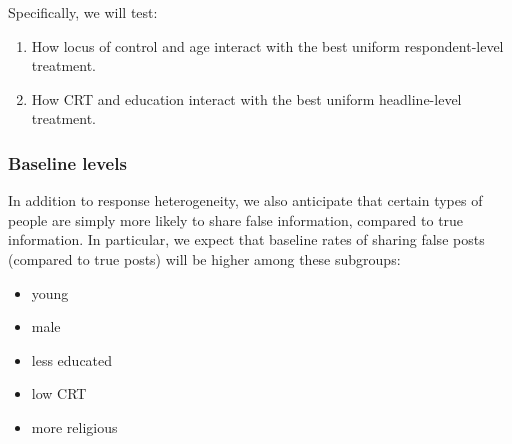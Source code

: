 \documentclass[letterpaper, 12pt, parskip=full,DIV=10]{scrartcl}
\begin{document}
Specifically, we will test:
\begin{enumerate}
\item How locus of control and age interact with the best uniform respondent-level treatment. 
\item How CRT and education interact with the best uniform headline-level treatment. 
\end{enumerate}


\subsubsection{Baseline levels}\label{baseline_levels}
In addition to response heterogeneity, we also anticipate that certain types of people are simply more likely to share false information, compared to true information. In particular, we expect that baseline rates of sharing false posts (compared to true posts) will be higher among these subgroups:
\begin{itemize}
\item young
\item male
\item less educated
\item low CRT
\item more religious
\end{itemize}

\end{document}
